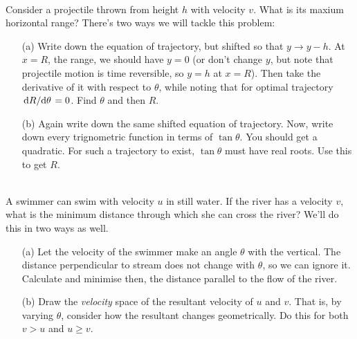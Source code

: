     \begin{exc}
        \begin{exercise}[subtitle={Projectile from a height}, points = 3]
            \smallskip
            ~\\
            Consider a projectile thrown from height $h$ with velocity $v$. What is its maxium horizontal range?
            There's two ways we will tackle this problem:

            \begin{enumerate}
                \item[(a)] Write down the equation of trajectory, but shifted so that $y \to y - h$. At $x = R$, the range,
                 we should have $y = 0$ (or don't change $y$, but note that projectile motion is time reversible, so $y=h$ at 
                 $x = R$). Then take the derivative of it with respect to $\theta$, while noting that for optimal trajectory 
                 $\dv*{R}{\theta} = 0$. Find $\theta$ and then $R$.
                 \item[(b)] Again write down the same shifted equation of trajectory. Now, write down every trignometric function
                 in terms of $\tan\theta$. You should get a quadratic. For such a trajectory to exist, $\tan\theta$ must have 
                 real roots. Use this to get $R$. 
            \end{enumerate}
        \end{exercise}

        \begin{exercise}[subtitle={River and Drift}, points = 2]
            \smallskip
            ~\\
            A swimmer can swim with velocity $u$ in still water. If the river has a velocity $v$, what is the minimum 
            distance through which she can cross the river? We'll do this in two ways as well.
            \begin{enumerate}
                \item[(a)] Let the velocity of the swimmer make an angle $\theta$ with the vertical. The distance perpendicular 
                to stream does not change with $\theta$, so we can ignore it. Calculate and minimise then, the distance 
                parallel to the flow of the river.
                \item[(b)] Draw the \emph{velocity} space of the resultant velocity of $u$ and $v$. That is, by varying $\theta$,
                consider how the resultant changes geometrically. Do this for both $v > u$ and $u \ge v$. 
            \end{enumerate}
        \end{exercise}


\end{exc}
